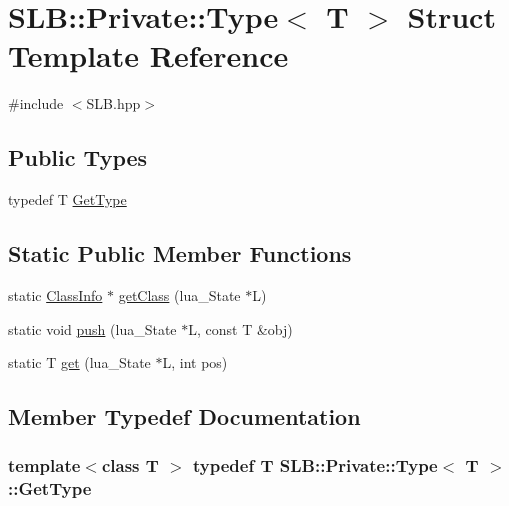 \hypertarget{structSLB_1_1Private_1_1Type}{}\section{S\+LB\+:\+:Private\+:\+:Type$<$ T $>$ Struct Template Reference}
\label{structSLB_1_1Private_1_1Type}


{\ttfamily \#include $<$S\+L\+B.\+hpp$>$}

\subsection*{Public Types}
\begin{DoxyCompactItemize}
\item 
typedef T \hyperlink{structSLB_1_1Private_1_1Type_a0e0ebf59136218109371a6786fff2ae2}{Get\+Type}
\end{DoxyCompactItemize}
\subsection*{Static Public Member Functions}
\begin{DoxyCompactItemize}
\item 
static \hyperlink{classSLB_1_1ClassInfo}{Class\+Info} $\ast$ \hyperlink{structSLB_1_1Private_1_1Type_a601772adf4f293194db6aea3ab44d5bd}{get\+Class} (lua\+\_\+\+State $\ast$L)
\item 
static void \hyperlink{structSLB_1_1Private_1_1Type_a8ac5672c3514f9781ba8edbfebae0d55}{push} (lua\+\_\+\+State $\ast$L, const T \&obj)
\item 
static T \hyperlink{structSLB_1_1Private_1_1Type_a871272ac85ac7e12329fcb9921f10e2b}{get} (lua\+\_\+\+State $\ast$L, int pos)
\end{DoxyCompactItemize}


\subsection{Member Typedef Documentation}
\subsubsection[{\texorpdfstring{Get\+Type}{GetType}}]{\setlength{\rightskip}{0pt plus 5cm}template$<$class T $>$ typedef T {\bf S\+L\+B\+::\+Private\+::\+Type}$<$ T $>$\+::{\bf Get\+Type}}\hypertarget{structSLB_1_1Private_1_1Type_a0e0ebf59136218109371a6786fff2ae2}{}\label{structSLB_1_1Private_1_1Type_a0e0ebf59136218109371a6786fff2ae2}


